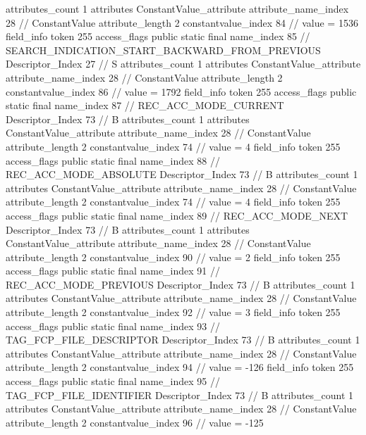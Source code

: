 {{{{{				attributes_count	1
				attributes {
				ConstantValue_attribute {
					attribute_name_index	28		// ConstantValue
					attribute_length	2
					constantvalue_index	84		// value = 1536
				}
				}
			}
			field_info {
				token	255
				access_flags	public static final
				name_index	85		// SEARCH_INDICATION_START_BACKWARD_FROM_PREVIOUS
				Descriptor_Index	27		// S
				attributes_count	1
				attributes {
				ConstantValue_attribute {
					attribute_name_index	28		// ConstantValue
					attribute_length	2
					constantvalue_index	86		// value = 1792
				}
				}
			}
			field_info {
				token	255
				access_flags	public static final
				name_index	87		// REC_ACC_MODE_CURRENT
				Descriptor_Index	73		// B
				attributes_count	1
				attributes {
				ConstantValue_attribute {
					attribute_name_index	28		// ConstantValue
					attribute_length	2
					constantvalue_index	74		// value = 4
				}
				}
			}
			field_info {
				token	255
				access_flags	public static final
				name_index	88		// REC_ACC_MODE_ABSOLUTE
				Descriptor_Index	73		// B
				attributes_count	1
				attributes {
				ConstantValue_attribute {
					attribute_name_index	28		// ConstantValue
					attribute_length	2
					constantvalue_index	74		// value = 4
				}
				}
			}
			field_info {
				token	255
				access_flags	public static final
				name_index	89		// REC_ACC_MODE_NEXT
				Descriptor_Index	73		// B
				attributes_count	1
				attributes {
				ConstantValue_attribute {
					attribute_name_index	28		// ConstantValue
					attribute_length	2
					constantvalue_index	90		// value = 2
				}
				}
			}
			field_info {
				token	255
				access_flags	public static final
				name_index	91		// REC_ACC_MODE_PREVIOUS
				Descriptor_Index	73		// B
				attributes_count	1
				attributes {
				ConstantValue_attribute {
					attribute_name_index	28		// ConstantValue
					attribute_length	2
					constantvalue_index	92		// value = 3
				}
				}
			}
			field_info {
				token	255
				access_flags	public static final
				name_index	93		// TAG_FCP_FILE_DESCRIPTOR
				Descriptor_Index	73		// B
				attributes_count	1
				attributes {
				ConstantValue_attribute {
					attribute_name_index	28		// ConstantValue
					attribute_length	2
					constantvalue_index	94		// value = -126
				}
				}
			}
			field_info {
				token	255
				access_flags	public static final
				name_index	95		// TAG_FCP_FILE_IDENTIFIER
				Descriptor_Index	73		// B
				attributes_count	1
				attributes {
				ConstantValue_attribute {
					attribute_name_index	28		// ConstantValue
					attribute_length	2
					constantvalue_index	96		// value = -125
}}}}}}}

